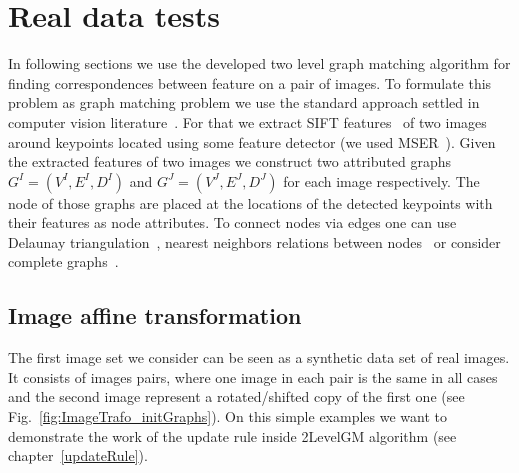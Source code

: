 \section{Real data tests}
In following sections we use the developed two level graph matching algorithm for finding correspondences between feature on a pair of images. To formulate this problem as graph matching problem we use the standard approach settled in computer vision literature~\cite{Cho2010_RRWM,Cho2012_ProgressiveGM,FastPFP,Hancock_EM_SVD,Hancock_GM_SpectralPart}. For that we extract SIFT features~\cite{Lowe2004} of two images around keypoints located using some feature detector (we used  MSER~\cite{MSER}). Given the extracted features of two images we construct two attributed graphs $G^I=(V^I,E^I,D^I)$ and $G^J=(V^J,E^J,D^J)$ for each image respectively. The node of those graphs are placed at the locations of the detected keypoints with their features as node attributes. To connect nodes via edges one can use Delaunay triangulation~\cite{Hancock_EM_SVD,Hancock_GM_SpectralPart}, nearest neighbors relations between nodes~\cite{Sanrom2012} or consider complete graphs~\cite{Cho2012_ProgressiveGM,Cho2014_Haystack}.

\subsection{Image affine transformation}
The first image set we consider can be seen as a synthetic data set of real images. It consists of images pairs, where one image in each pair is the same in all cases and the second image represent a rotated/shifted copy of the first one (see Fig.~\ref{fig:ImageTrafo_initGraphs}). On this simple examples we want to demonstrate the work of the update rule inside 2LevelGM algorithm (see chapter~\ref{updateRule}).

